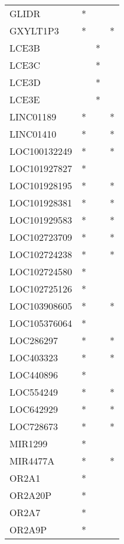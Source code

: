 \begin{tabular}{lccc}
GLIDR              &   * &     &         \\
GXYLT1P3           &   * &     &       * \\
LCE3B              &     &   * &         \\
LCE3C              &     &   * &         \\
LCE3D              &     &   * &         \\
LCE3E              &     &   * &         \\
LINC01189          &   * &     &       * \\
LINC01410          &   * &     &       * \\
LOC100132249       &   * &     &       * \\
LOC101927827       &   * &     &         \\
LOC101928195       &   * &     &       * \\
LOC101928381       &   * &     &       * \\
LOC101929583       &   * &     &       * \\
LOC102723709       &   * &     &       * \\
LOC102724238       &   * &     &       * \\
LOC102724580       &   * &     &         \\
LOC102725126       &   * &     &         \\
LOC103908605       &   * &     &       * \\
LOC105376064       &   * &     &         \\
LOC286297          &   * &     &       * \\
LOC403323          &   * &     &       * \\
LOC440896          &   * &     &         \\
LOC554249          &   * &     &       * \\
LOC642929          &   * &     &       * \\
LOC728673          &   * &     &       * \\
MIR1299            &   * &     &         \\
MIR4477A           &   * &     &       * \\
OR2A1              &   * &     &         \\
OR2A20P            &   * &     &         \\
OR2A7              &   * &     &         \\
OR2A9P             &   * &     &         \\

\end{tabular}
